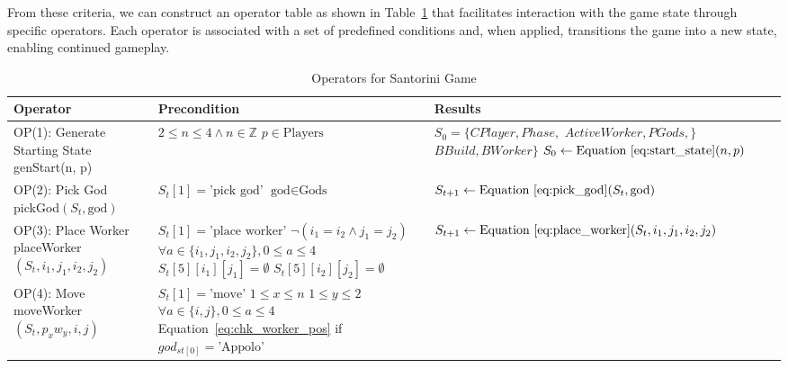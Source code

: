 \documentclass{telkomnika}
\begin{document}
From these criteria, we can construct an operator table as shown in Table~\ref{tab:operators} that facilitates interaction with the game state through specific operators.
Each operator is associated with a set of predefined conditions and, when applied, transitions the game into a new state, enabling continued gameplay.

\begin{table}[h]
\caption{Operators for Santorini Game}
\label{tab:operators}
\begin{tabularx}{\textwidth}{|X|X|X|}
\hline
\textbf{Operator} & \textbf{Precondition} & \textbf{Results} \\ \hline
OP(1): Generate Starting State \newline genStart(n, p) & 
$2 \leq n \leq 4 \land n \in \mathbb{Z}$ \newline $p \in \text{Players}$ & 
$S_0 = \{CPlayer, Phase,$
$ActiveWorker, PGods,\}$
$BBuild, BWorker\}$ \newline
$S_0 \gets \text{Equation~\ref{eq:start_state}}(n, p)$ \\ \hline
OP(2): Pick God \newline pickGod$(S_t, \text{god})$ & 
$S_t[1] = \text{'pick god'}$ \newline $\text{god} \in \text{Gods}$ & 
$S_{t+1} \gets \text{Equation~\ref{eq:pick_god}}(S_t, \text{god})$ \\ \hline
OP(3): Place Worker \newline placeWorker$(S_t, i_1, j_1, i_2, j_2)$ & 
$S_t[1] = \text{'place worker'}$ \newline $\neg(i_1 = i_2 \land j_1 = j_2)$ \newline $\forall a \in \{i_1, j_1, i_2, j_2\}, 0 \leq a \leq 4$ \newline $S_t[5][i_1][j_1] = \emptyset$ \newline $S_t[5][i_2][j_2] = \emptyset$ & 
$S_{t+1} \gets \text{Equation~\ref{eq:place_worker}}(S_t, i_1, j_1, i_2, j_2)$ \\ \hline
OP(4): Move \newline moveWorker$(S_t, p_xw_y, i, j)$ & 
$S_t[1] = \text{'move'}$ \newline $1 \leq x \leq n$ \newline $1 \leq y \leq 2$ \newline $\forall a \in \{i, j\}, 0 \leq a \leq 4$ \newline
Equation~\ref{eq:chk_worker_pos} \newline
if $god_{st[0]} =  \text{'Appolo'}$\newline

\end{tabularx}
\end{table}
\end{document}
